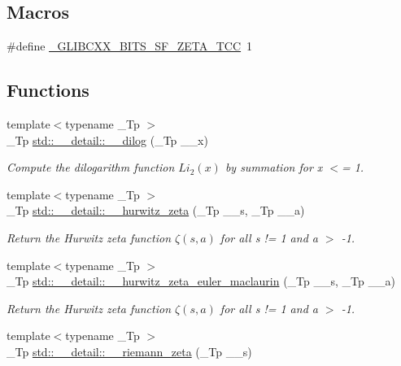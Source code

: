 \subsection*{Macros}
\begin{DoxyCompactItemize}
\item 
\#define \hyperlink{sf__zeta_8tcc_a23ad81fae0dc2d916125d596553c5dfc}{\+\_\+\+G\+L\+I\+B\+C\+X\+X\+\_\+\+B\+I\+T\+S\+\_\+\+S\+F\+\_\+\+Z\+E\+T\+A\+\_\+\+T\+C\+C}~1
\end{DoxyCompactItemize}
\subsection*{Functions}
\begin{DoxyCompactItemize}
\item 
{\footnotesize template$<$typename \+\_\+\+Tp $>$ }\\\+\_\+\+Tp \hyperlink{namespacestd_1_1____detail_a5083a0c9fce3299593ca22e7dbaeaf19}{std\+::\+\_\+\+\_\+detail\+::\+\_\+\+\_\+dilog} (\+\_\+\+Tp \+\_\+\+\_\+x)
\begin{DoxyCompactList}\small\item\em Compute the dilogarithm function $ Li_2(x) $ by summation for x $<$= 1. \end{DoxyCompactList}\item 
{\footnotesize template$<$typename \+\_\+\+Tp $>$ }\\\+\_\+\+Tp \hyperlink{namespacestd_1_1____detail_a63aafed798ada71b2cc58e84a6652169}{std\+::\+\_\+\+\_\+detail\+::\+\_\+\+\_\+hurwitz\+\_\+zeta} (\+\_\+\+Tp \+\_\+\+\_\+s, \+\_\+\+Tp \+\_\+\+\_\+a)
\begin{DoxyCompactList}\small\item\em Return the Hurwitz zeta function $ \zeta(s,a) $ for all s != 1 and a $>$ -\/1. \end{DoxyCompactList}\item 
{\footnotesize template$<$typename \+\_\+\+Tp $>$ }\\\+\_\+\+Tp \hyperlink{namespacestd_1_1____detail_a56c55858723fe9e0c541f0e77572b58d}{std\+::\+\_\+\+\_\+detail\+::\+\_\+\+\_\+hurwitz\+\_\+zeta\+\_\+euler\+\_\+maclaurin} (\+\_\+\+Tp \+\_\+\+\_\+s, \+\_\+\+Tp \+\_\+\+\_\+a)
\begin{DoxyCompactList}\small\item\em Return the Hurwitz zeta function $ \zeta(s,a) $ for all s != 1 and a $>$ -\/1. \end{DoxyCompactList}\item 
{\footnotesize template$<$typename \+\_\+\+Tp $>$ }\\\+\_\+\+Tp \hyperlink{namespacestd_1_1____detail_a2be77d9bdd1b8b463be44a0e7558bc2a}{std\+::\+\_\+\+\_\+detail\+::\+\_\+\+\_\+riemann\+\_\+zeta} (\+\_\+\+Tp \+\_\+\+\_\+s)

\end{DoxyCompactItemize}
